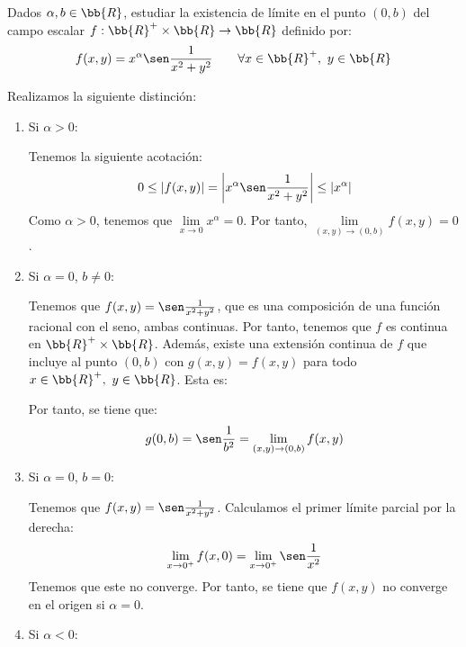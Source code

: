 \begin{ejercicio}
    Dados $\alpha, b \in \bb{R}$, estudiar la existencia de límite en el punto $(0, b)$ del campo escalar $f : \bb{R}^+\times \bb{R} \to \bb{R}$ definido por:
    \begin{equation*}
        f(x,y)=x^\alpha\sen \frac{1}{x^2+y^2} \qquad \forall x\in \bb{R}^+,~y\in \bb{R}
    \end{equation*}

    Realizamos la siguiente distinción:
    \begin{enumerate}
        \item Si $\alpha>0$:

        Tenemos la siguiente acotación:
        \begin{equation*}
            0\leq |f(x,y)|
            =\left|x^\alpha\sen \frac{1}{x^2+y^2}\right|
            \leq |x^\alpha|
        \end{equation*}
        Como $\alpha>0$, tenemos que $\lim\limits_{x\to 0}x^\alpha=0$. Por tanto, $\lim\limits_{(x,y)\to (0,b)} f(x,y)=0$.

        \item Si $\alpha=0$, $b\neq 0$:

        Tenemos que $f(x,y)=\sen \frac{1}{x^2+y^2}$, que es una composición de una función racional con el seno, ambas continuas. Por tanto, tenemos que $f$ es continua en $\bb{R}^+\times \bb{R}$. Además, existe una extensión continua de $f$ que incluye al punto $(0,b)$ con $g(x,y)=f(x,y)$ para todo $x\in \bb{R}^+,~y\in \bb{R}$. Esta es:

        Por tanto, se tiene que:
        \begin{equation*}
            g(0,b)=\sen \frac{1}{b^2} = \lim_{(x,y)\to (0,b)}f(x,y)
        \end{equation*}

        \item Si $\alpha=0$, $b=0$:

        Tenemos que $f(x,y)=\sen \frac{1}{x^2+y^2}$. Calculamos el primer límite parcial por la derecha:
        \begin{equation*}
            \lim_{x\to 0^+}f(x,0)=\lim_{x\to 0^+}\sen \frac{1}{x^2}
        \end{equation*}
        Tenemos que este no converge. Por tanto, se tiene que $f(x,y)$ no converge en el origen si $\alpha=0$.

        \item Si $\alpha<0$:        


\end{enumerate}
\end{ejercicio}
